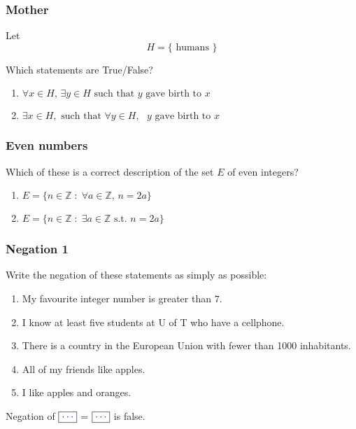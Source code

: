 \documentclass[14pt]{beamer}
\newcommand {\DS} [1] {${\displaystyle #1}$}
\newcommand {\Z}{\mathbb{Z}}
\newcommand{\azul}[1]{{\color{blue} #1}}
\newcommand{\majab}[1]{\boxed{\azul{ #1}}}
\begin{document}
\begin{frame}
\frametitle{Mother}
	\vfill

	Let \[H=\{\text{ humans }\}\]

	Which statements are True/False?
	\begin{enumerate}
		\item $\displaystyle{\forall x\in H,\, \exists y\in H\text{ such that $y$ gave birth to $x$}}$
		\item $\displaystyle{\exists x\in H,\text{ such that } \forall y\in H, \text{ $y$ gave birth to $x$}}$
	\end{enumerate}

	\vfill

\end{frame}

\begin{frame}[t]
\frametitle{Even numbers}

Which of these is a correct description of the set $E$ of even integers?
\begin{enumerate}
	\item \DS{	E = \{  n \in \Z \; : \; \forall a \in \Z,  \, n = 2a \} }
	\item \DS{	E = \{  n \in \Z \; : \; \exists a \in \Z \mbox{ s.t. } n = 2a \} }
\end{enumerate}

\vfill 


\end{frame}

\begin{frame} \frametitle{Negation 1}

Write the negation of these statements as simply as possible:

	\begin{enumerate}
		\item  My favourite integer number is greater than $7$.
		\item  I know at least five students at U of T who have a cellphone.
		\item  There is a country in the European Union with fewer than 1000 inhabitants.
		\item  All of my friends like apples.
		\item  I like apples and oranges.
	\end{enumerate}	
	
\vfill

	\begin{center}
		
		Negation of  \DS{\majab{\cdots}} \; = \; \DS{\majab{\cdots}} is false. 
	
	\end{center}	
\end{frame}
\end{document}
